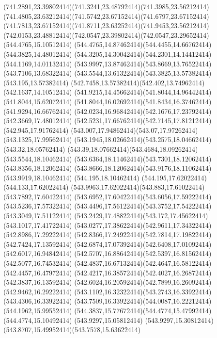 {{	\curveto(741.2891,23.39802414)(741.3241,23.48792414)(741.3985,23.56212414)
	\curveto(741.4805,23.63212414)(741.5742,23.67152414)(741.6797,23.67152414)
	\curveto(741.7813,23.67152414)(741.8711,23.63252414)(741.9453,23.56212414)
	\curveto(742.0153,23.48812414)(742.0547,23.39802414)(742.0547,23.29652414)
	\closepath
	\moveto(544.4765,15.10512414)
	\curveto(544.4765,14.87462414)(544.4455,14.66762414)(544.3825,14.48012414)
	\curveto(544.3205,14.30042414)(544.2301,14.14412414)(544.1169,14.01132414)
	\curveto(543.9997,13.87462414)(543.8669,13.76522414)(543.7106,13.68322414)
	\curveto(543.5544,13.61322414)(543.3825,13.57382414)(543.195,13.57382414)
	\curveto(542.7458,13.57382414)(542.402,13.74962414)(542.1637,14.10512414)
	\curveto(541.9215,14.45662414)(541.8044,14.96442414)(541.8044,15.62072414)
	\curveto(541.8044,16.02692414)(541.8434,16.37462414)(541.9294,16.66762414)
	\curveto(542.0234,16.96842414)(542.1676,17.23792414)(542.3669,17.48012414)
	\curveto(542.5231,17.66762414)(542.7145,17.81212414)(542.945,17.91762414)
	\curveto(543.007,17.94862414)(543.07,17.97262414)(543.1325,17.99562414)
	\curveto(543.1945,18.02662414)(543.2575,18.04662414)(543.32,18.05762414)
	\curveto(543.39,18.07662414)(543.4684,18.09262414)(543.5544,18.10462414)
	\curveto(543.6364,18.11462414)(543.7301,18.12062414)(543.8356,18.12062414)
	\curveto(543.8666,18.12062414)(543.9176,18.11062414)(543.9919,18.10462414)
	\lineto(544.195,18.10462414)
	\lineto(544.195,17.62022414)
	\lineto(544.133,17.62022414)
	\curveto(543.9963,17.62022414)(543.883,17.61022414)(543.7892,17.60422414)
	\curveto(543.6952,17.60422414)(543.6056,17.59222414)(543.5236,17.57322414)
	\curveto(543.4496,17.56122414)(543.3752,17.54222414)(543.3049,17.51122414)
	\curveto(543.2429,17.48822414)(543.172,17.45622414)(543.1017,17.41722414)
	\curveto(543.0277,17.38622414)(542.9611,17.34322414)(542.8986,17.29222414)
	\curveto(542.8366,17.24922414)(542.7814,17.19822414)(542.7424,17.13592414)
	\curveto(542.6874,17.07392414)(542.6408,17.01092414)(542.6017,16.94842414)
	\curveto(542.5707,16.88642414)(542.5397,16.81562414)(542.5077,16.74532414)
	\curveto(542.4837,16.67132414)(542.4647,16.58122414)(542.4457,16.47972414)
	\curveto(542.4217,16.38572414)(542.4027,16.26872414)(542.3837,16.13592414)
	\curveto(542.6024,16.20592414)(542.7899,16.26092414)(542.9462,16.29222414)
	\curveto(543.1102,16.32322414)(543.2743,16.33922414)(543.4306,16.33922414)
	\curveto(543.7509,16.33922414)(544.0087,16.22212414)(544.1962,15.99552414)
	\curveto(544.3837,15.77672414)(544.4774,15.47992414)(544.4774,15.10492414)
	\closepath
	\moveto(543.9297,15.05812414)
	\curveto(543.9297,15.30812414)(543.8707,15.49952414)(543.7578,15.63622414)
}}

